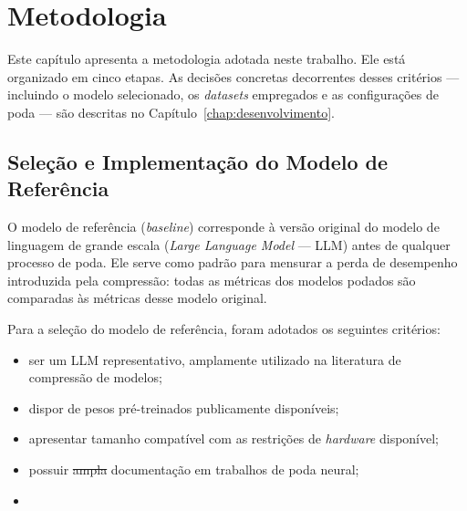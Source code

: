 
\chapter{Metodologia}\label{chap:metodologia}

Este capítulo apresenta a metodologia adotada neste trabalho. Ele está organizado em cinco etapas. 
As decisões concretas decorrentes desses critérios --- incluindo o modelo selecionado, os
\textit{datasets} empregados e as configurações de poda --- são descritas no
Capítulo~\ref{chap:desenvolvimento}.

\section{Seleção e Implementação do Modelo de Referência}\label{sec:metodologia_modelo}



O modelo de referência (\textit{baseline}) corresponde à versão original do modelo de linguagem
de grande escala (\textit{Large Language Model} --- LLM) antes de qualquer processo de poda.
Ele serve como padrão para mensurar a perda de desempenho introduzida pela compressão: todas as
métricas dos modelos podados são comparadas às métricas desse modelo original.

Para a seleção do modelo de referência, foram adotados os seguintes critérios:

\begin{itemize}
    \item ser um LLM representativo, amplamente utilizado na literatura de compressão de modelos;
    \item dispor de pesos pré-treinados publicamente disponíveis;
    \item apresentar tamanho compatível com as restrições de \textit{hardware} disponível;
    \item possuir \st{ampla} documentação em trabalhos de poda neural;
    \item {}
\end{itemize}


